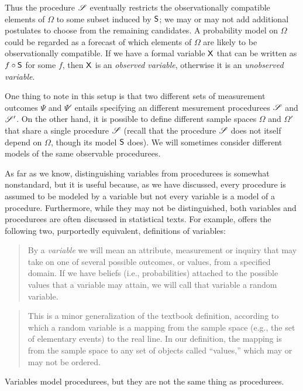 Thus the procedure $\mathscr{S}$ eventually restricts the observationally compatible elements of $\Omega$ to some subset induced by $\mathsf{S}$; we may or may not add additional postulates to choose from the remaining candidates. A probability model on $\Omega$ could be regarded as a forecast of which elements of $\Omega$ are likely to be observationally compatible. If we have a formal variable $\mathsf{X}$ that can be written as $f\circ \mathsf{S}$ for some $f$, then $\mathsf{X}$ is an \emph{observed variable}, otherwise it is an \emph{unobserved variable}.

One thing to note in this setup is that two different sets of measurement outcomes $\Psi$ and $\Psi'$ entails specifying an different mesurement procedurees $\mathscr{S}$ and $\mathscr{S}'$. On the other hand, it is possible to define different sample spaces $\Omega$ and $\Omega'$ that share a single procedure $\mathscr{S}$ (recall that the procedure $\mathscr{S}$ does not itself depend on $\Omega$, though its model $\mathsf{S}$ does). We will sometimes consider different models of the same observable procedurees.

As far as we know, distinguishing variables from procedurees is somewhat nonstandard, but it is useful because, as we have discussed, every procedure is assumed to be modeled by a variable but not every variable is a model of a procedure. Furthermore, while they may not be distinguished, both variables and procedurees are often discussed in statistical texts. For example, \citet{pearl_causality:_2009} offers the following two, purportedly equivalent, definitions of variables:
\begin{quote}
By a \emph{variable} we will mean an attribute, measurement or inquiry that may take on one of several possible outcomes, or values, from a specified domain. If we have beliefs (i.e., probabilities) attached to the possible values that a variable may attain, we will call that variable a random variable.
\end{quote}

\begin{quote}
This is a minor generalization of the textbook definition, according to which a random variable is a mapping from the sample space (e.g., the set of elementary events) to the real line. In our definition, the mapping is from the sample space to any set of objects called ``values,'' which may or may not be ordered.
\end{quote}

Variables model procedurees, but they are not the same thing as procedurees.

